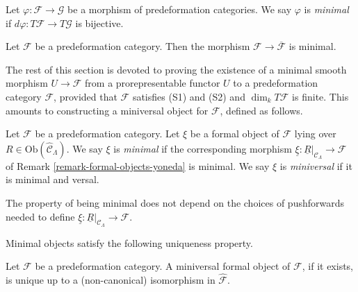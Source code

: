 \begin{definition}
\label{definition-minimal-morphism}
Let $\varphi: \mathcal{F} \to \mathcal G$ be a morphism of 
predeformation categories.  We say $\varphi$ is {\it minimal} if $d \varphi: 
 T \mathcal{F} \to T \mathcal G$ is bijective.
\end{definition}

\begin{remark}
\label{remark-predeformation-category-minimal-over-iso}
Let $\mathcal{F}$ be a predeformation category.  Then the morphism $\mathcal{F} 
\to \overline{\mathcal{F}}$ is minimal.
\end{remark}

\noindent
The rest of this section is devoted to proving the existence of a minimal 
smooth morphism $U \to \mathcal{F}$ from a prorepresentable functor $U$ 
to a predeformation category $\mathcal{F}$, provided that $\mathcal{F}$ satisfies 
(S1) and (S2) and $\dim_{k} T\mathcal{F}$ is finite.  This amounts to 
constructing a miniversal object for $\mathcal{F}$, defined as follows.

\begin{definition}
\label{definition-miniversal-object}
Let $\mathcal{F}$ be a predeformation category.  Let $\xi$ be a formal object of 
$\mathcal{F}$ lying over $R \in \text{Ob}(\widehat{\mathcal 
C}_\Lambda)$.  We say $\xi$ is {\it minimal} if the corresponding morphism 
$\underline{\xi}: \underline{R}|_{\mathcal{C}_\Lambda} \to \mathcal{F}$ 
of Remark \ref{remark-formal-objects-yoneda} is minimal.  We say $\xi$ is 
{\it miniversal} if it is minimal and versal.
\end{definition}

\begin{remark}
\label{remark-choice-pushforwards-iso-class}
The property of being minimal does not depend on the choices of pushforwards 
needed to define $\underline{\xi}: \underline{R}|_{\mathcal{C}_\Lambda} 
\to \mathcal{F}$.
\end{remark}

\noindent
Minimal objects satisfy the following uniqueness property.

\begin{lemma}
\label{lemma-miniversal-object-unique}
Let $\mathcal{F}$ be a predeformation category.  A miniversal formal object of 
$\mathcal{F}$, if it exists, is unique up to a (non-canonical) isomorphism in 
$\widehat{\mathcal{F}}$.
\end{lemma}

